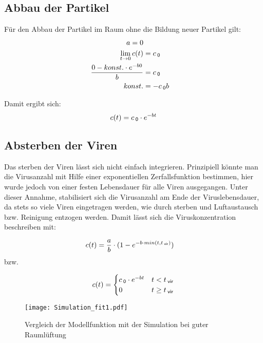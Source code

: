 \documentclass[12pt,a4paper,bibtotocnumbered,liststotocnumbered]{scrreprt}
\begin{document}
\subsection{Abbau der Partikel}
Für den Abbau der Partikel im Raum ohne die Bildung neuer Partikel gilt:
\begin{align}
a = 0\\
\lim \limits_{t \to 0} c(t) & = c_{\: \mathsf{0}}\\
\frac{0 - konst. \cdot e^{-b0}}{b} &= c_{\: \mathsf{0}}\\
konst. &= - c_{\: \mathsf{0}} b\\
\end{align}

Damit ergibt sich:
\begin{align}
c(t) =  c_{\: \mathsf{0}} \cdot e^{-bt}
\end{align}

\subsection{Absterben der Viren}
Das sterben der Viren lässt sich nicht einfach integrieren. Prinzipiell könnte man die Virusanzahl mit Hilfe einer exponentiellen Zerfallsfunktion bestimmen, hier wurde jedoch von einer festen Lebensdauer für alle Viren ausgegangen. Unter dieser Annahme, stabilisiert sich die Virusanzahl am Ende der Viruslebensdauer, da stets so viele Viren eingetragen werden, wie durch sterben und Luftaustausch bzw. Reinigung entzogen werden. Damit lässt sich die Viruskonzentration beschreiben mit:

\begin{align}
\label{Equ.: conc}
c(t) &= \frac{a}{b}\cdot(1 - e^{-b\cdot min(t,t_{\: \mathsf{vir}})})
\end{align}
bzw.


\begin{align}
c(t) =
\begin{cases} 
c_{\: \mathsf{0}} \cdot e^{-bt} & t < t_{\: \mathsf{vir}} \\
0 & t \geq t_{\: \mathsf{vir}} \\
\end{cases}
\end{align}

\begin{figure}[H]
\begin{center}
\texttt{[image: Simulation\_fit1.pdf]}
\caption{Vergleich der Modellfunktion mit der Simulation bei guter Raumlüftung}
\label{Abb: Modell gut}
\end{center}
\end{figure}
\end{document}
